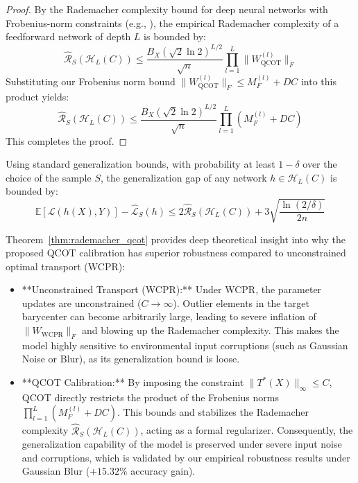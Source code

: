 \documentclass{article}
\theoremstyle{plain}
\theoremstyle{definition}
\theoremstyle{remark}
\begin{document}
\begin{proof}
By the Rademacher complexity bound for deep neural networks with Frobenius-norm constraints (e.g., \cite{Golowich2018SizeIndependent}), the empirical Rademacher complexity of a feedforward network of depth $L$ is bounded by:
\begin{equation}
    \widehat{\mathcal{R}}_S\left( \mathcal{H}_L(C) \right) \le \frac{B_X (\sqrt{2}\ln 2)^{L/2}}{\sqrt{n}} \prod_{l=1}^L \|W_{\text{QCOT}}^{(l)}\|_F
\end{equation}
Substituting our Frobenius norm bound $\|W_{\text{QCOT}}^{(l)}\|_F \le M_F^{(l)} + D C$ into this product yields:
\begin{equation}
    \widehat{\mathcal{R}}_S\left( \mathcal{H}_L(C) \right) \le \frac{B_X (\sqrt{2}\ln 2)^{L/2}}{\sqrt{n}} \prod_{l=1}^L \left( M_F^{(l)} + D C \right)
\end{equation}
This completes the proof.
\end{proof}

Using standard generalization bounds, with probability at least $1 - \delta$ over the choice of the sample $S$, the generalization gap of any network $h \in \mathcal{H}_L(C)$ is bounded by:
\begin{equation}
    \mathbb{E}[\mathcal{L}(h(X), Y)] - \widehat{\mathcal{L}}_S(h) \le 2 \widehat{\mathcal{R}}_S\left( \mathcal{H}_L(C) \right) + 3\sqrt{\frac{\ln(2/\delta)}{2n}}
\end{equation}

Theorem~\ref{thm:rademacher_qcot} provides deep theoretical insight into why the proposed QCOT calibration has superior robustness compared to unconstrained optimal transport (WCPR):
\begin{itemize}
    \item **Unconstrained Transport (WCPR):** Under WCPR, the parameter updates are unconstrained ($C \to \infty$). Outlier elements in the target barycenter can become arbitrarily large, leading to severe inflation of $\|W_{\text{WCPR}}\|_F$ and blowing up the Rademacher complexity. This makes the model highly sensitive to environmental input corruptions (such as Gaussian Noise or Blur), as its generalization bound is loose.
    \item **QCOT Calibration:** By imposing the constraint $\|T^*(X)\|_{\infty} \le C$, QCOT directly restricts the product of the Frobenius norms $\prod_{l=1}^L \left( M_F^{(l)} + D C \right)$. This bounds and stabilizes the Rademacher complexity $\widehat{\mathcal{R}}_S(\mathcal{H}_L(C))$, acting as a formal regularizer. Consequently, the generalization capability of the model is preserved under severe input noise and corruptions, which is validated by our empirical robustness results under Gaussian Blur ($+15.32\%$ accuracy gain).
\end{itemize}
\end{document}
